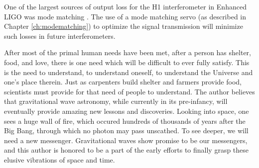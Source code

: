 One of the largest sources of output loss for the H1 interferometer in Enhanced LIGO was mode matching \cite{Tobin}. %
The use of a mode matching servo (as described in Chapter \ref{ch:modematching}) to optimize the signal transmission will minimize such losses in future interferometers.

After most of the primal human needs have been met, after a person has shelter, food, and love, there is one need which will be difficult to ever fully satisfy. %
This is the need to understand, to understand oneself, to understand the Universe and one's place therein. %
Just as carpenters build shelter and farmers provide food, scientists must provide for that need of people to understand. %
The author believes that gravitational wave astronomy, while currently in its pre-infancy, will eventually provide amazing new lessons and discoveries. %
Looking into space, one sees a huge wall of fire, which occured hundreds of thousands of years after the Big Bang, through which no photon may pass unscathed. %
To see deeper, we will need a new messenger. %
Gravitational waves show promise to be our messengers, and this author is honored to be a part of the early efforts to finally grasp these elusive vibrations of space and time.
